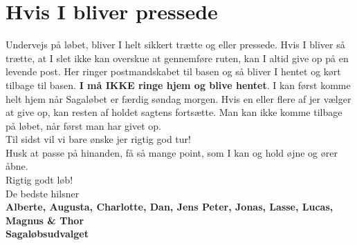 \section{Hvis I bliver pressede}
Undervejs på løbet, bliver I helt sikkert trætte og eller pressede. Hvis I bliver så trætte, at I slet ikke kan overskue at gennemføre ruten, kan I altid give op på en levende post. Her ringer postmandskabet til basen og så bliver I hentet og kørt tilbage til basen. \textbf{I må IKKE ringe hjem og blive hentet}. I kan først komme helt hjem når Sagaløbet er færdig søndag morgen. Hvis en eller flere af jer vælger at give op, kan resten af holdet sagtens fortsætte. Man kan ikke komme tilbage på løbet, når først man har givet op.\\
\newline
Til sidst vil vi bare ønske jer rigtig god tur!\\
Husk at passe på hinanden, få så mange point, som I kan og hold øjne og ører åbne.\\
\newline
Rigtig godt løb!\\
\newline
\textcolor{søblå}{De bedste hilsner}\\
\textcolor{natblå}{\textbf{Alberte, Augusta, Charlotte, Dan, Jens Peter, Jonas, Lasse, Lucas, Magnus \& Thor}}\\
\textcolor{natblå}{\textbf{Sagaløbsudvalget}}\\
\newpage

